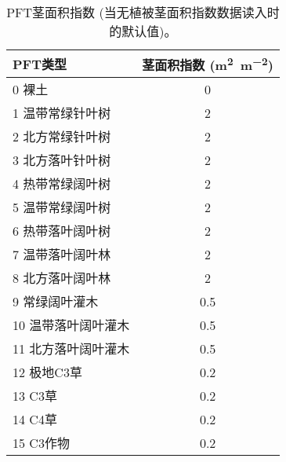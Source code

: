 \begin{table}[]
    \centering
    \caption{PFT茎面积指数 (当无植被茎面积指数数据读入时的默认值)。}
    \label{tab:PFT茎面积指数}
    \begin{tabular}{@{}lc@{}}
    \toprule
    PFT类型       & 茎面积指数 (\unit{m^2.m^{-2}}) \\ \midrule
    0 裸土        & 0              \\
    1 温带常绿针叶树   & 2              \\
    2 北方常绿针叶树   & 2              \\
    3 北方落叶针叶树   & 2              \\
    4 热带常绿阔叶树   & 2              \\
    5 温带常绿阔叶树   & 2              \\
    6 热带落叶阔叶树   & 2              \\
    7 温带落叶阔叶林   & 2              \\
    8 北方落叶阔叶林   & 2              \\
    9 常绿阔叶灌木    & 0.5            \\
    10 温带落叶阔叶灌木 & 0.5            \\
    11 北方落叶阔叶灌木 & 0.5            \\
    12 极地C3草    & 0.2            \\
    13 C3草      & 0.2            \\
    14 C4草      & 0.2            \\
    15 C3作物     & 0.2            \\ \bottomrule
    \end{tabular}
\end{table}


